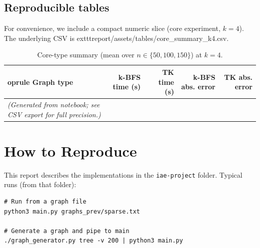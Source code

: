 \documentclass[11pt]{article}
\begin{document}
\subsection{Reproducible tables}

For convenience, we include a compact numeric slice (core experiment, $k=4$). The underlying CSV is
	exttt{report/assets/tables/core\_summary\_k4.csv}.

\begin{table}[h]
\centering
\caption{Core-type summary (mean over $n\in\{50,100,150\}$) at $k=4$.}
\label{tab:core-k4}
\begin{tabular}{lrrrr}
	oprule
Graph type & k-BFS time (s) & TK time (s) & k-BFS abs. error & TK abs. error\\
\midrule
\emph{(Generated from notebook; see CSV export for full precision.)} \\
\bottomrule
\end{tabular}
\end{table}

\section{How to Reproduce}

This report describes the implementations in the \texttt{iae-project} folder. Typical runs (from that folder):

\begin{lstlisting}
# Run from a graph file
python3 main.py graphs_prev/sparse.txt

# Generate a graph and pipe to main
./graph_generator.py tree -v 200 | python3 main.py
\end{lstlisting}
\end{document}
